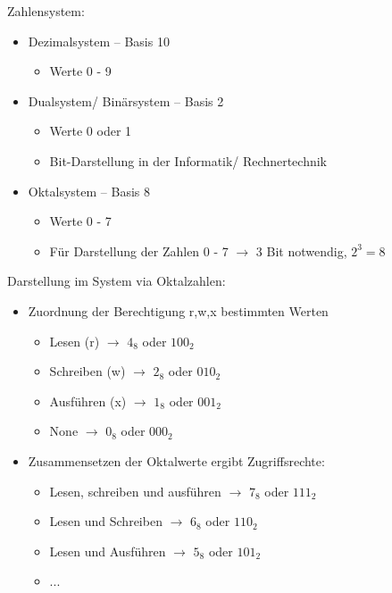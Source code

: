 \documentclass[xcolor=dvipsnames,aspectratio=169]{beamer}
\begin{document}
\begin{frame}
Zahlensystem:
\begin{itemize}
	\item Dezimalsystem -- Basis 10
	\begin{itemize}
		\item Werte 0 - 9 
	\end{itemize}
	\item Dualsystem/ Binärsystem -- Basis 2
	\begin{itemize}
		\item Werte 0 oder 1
		\item Bit-Darstellung in der Informatik/ Rechnertechnik
	\end{itemize}
	\item Oktalsystem -- Basis 8
	\begin{itemize}
		\item Werte 0 - 7
		\item Für Darstellung der Zahlen 0 - 7 $\rightarrow$ 3 Bit notwendig, $2^3 = 8$
	\end{itemize}
\end{itemize}
\end{frame}


\begin{frame}
Darstellung im System via Oktalzahlen:
\begin{itemize}
	\item Zuordnung der Berechtigung r,w,x bestimmten Werten
	\begin{itemize}
		\item Lesen (r) $\rightarrow$ $4_8$ oder $100_2$
		\item Schreiben (w) $\rightarrow$ $2_8$ oder $010_2$
		\item Ausführen (x) $\rightarrow$ $1_8$ oder $001_2$
		\item None $\rightarrow$ $0_8$ oder $000_2$
	\end{itemize}
	\item Zusammensetzen der Oktalwerte ergibt Zugriffsrechte:
	\begin{itemize}
		\item Lesen, schreiben und ausführen $\rightarrow$ $7_8$ oder $111_2$
		\item Lesen und Schreiben $\rightarrow$ $6_8$ oder $110_2$
		\item Lesen und Ausführen $\rightarrow$ $5_8$ oder $101_2$
		\item ...
	\end{itemize}
\end{itemize}
\end{frame}
\end{document}
